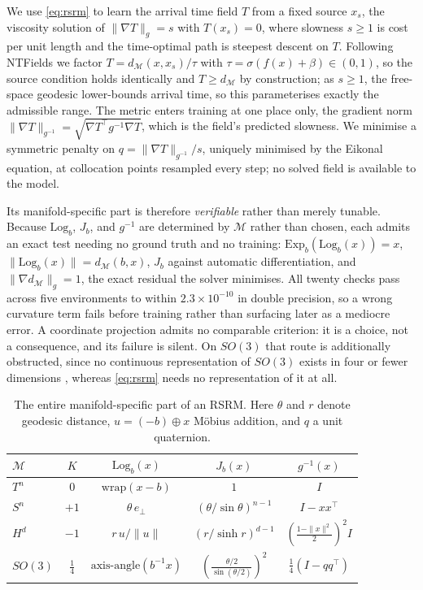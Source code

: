 We use \eqref{eq:rsrm} to learn the arrival time field $T$ from a fixed source $x_s$, the viscosity solution of $\|\nabla T\|_g = s$ with $T(x_s)=0$, where slowness $s \geq 1$ is cost per unit length and the time-optimal path is steepest descent on $T$. Following NTFields \cite{ni2023ntfields} we factor $T = d_\mathcal{M}(x,x_s)/\tau$ with $\tau = \sigma(f(x)+\beta) \in (0,1)$, so the source condition holds identically and $T \geq d_\mathcal{M}$ by construction; as $s \geq 1$, the free-space geodesic lower-bounds arrival time, so this parameterises exactly the admissible range. The metric enters training at one place only, the gradient norm $\|\nabla T\|_{g^{-1}} = \sqrt{\nabla T^\top g^{-1} \nabla T}$, which is the field's predicted slowness. We minimise a symmetric penalty on $q = \|\nabla T\|_{g^{-1}}/s$, uniquely minimised by the Eikonal equation, at collocation points resampled every step; no solved field is available to the model.

Its manifold-specific part is therefore \emph{verifiable} rather than merely tunable. Because $\mathrm{Log}_b$, $J_b$, and $g^{-1}$ are determined by $\mathcal{M}$ rather than chosen, each admits an exact test needing no ground truth and no training: $\mathrm{Exp}_b(\mathrm{Log}_b(x)) = x$, $\|\mathrm{Log}_b(x)\| = d_\mathcal{M}(b,x)$, $J_b$ against automatic differentiation, and $\|\nabla d_\mathcal{M}\|_g = 1$, the exact residual the solver minimises. All twenty checks pass across five environments to within $2.3\times10^{-10}$ in double precision, so a wrong curvature term fails before training rather than surfacing later as a mediocre error. A coordinate projection admits no comparable criterion: it is a choice, not a consequence, and its failure is silent. On $SO(3)$ that route is additionally obstructed, since no continuous representation of $SO(3)$ exists in four or fewer dimensions \cite{zhou2019continuity}, whereas \eqref{eq:rsrm} needs no representation of it at all.

\begin{table}[t]
\centering
\caption{The entire manifold-specific part of an \ac{RSRM}. Here $\theta$ and $r$ denote geodesic distance, $u = (-b) \oplus x$ M\"obius addition, and $q$ a unit quaternion.}
\label{tab:geometry}
\footnotesize
\begin{tabular}{lcccc}
\hline
$\mathcal{M}$ & $K$ & $\mathrm{Log}_b(x)$ & $J_b(x)$ & $g^{-1}(x)$ \\
\hline
$T^n$    & $0$            & $\mathrm{wrap}(x-b)$                  & $1$                                                 & $I$ \\
$S^n$    & $+1$           & $\theta \, e_\perp$                   & $(\theta/\sin\theta)^{n-1}$                         & $I - xx^\top$ \\
$H^d$    & $-1$           & $r \, u/\|u\|$                        & $(r/\sinh r)^{d-1}$                                 & $\left(\tfrac{1-\|x\|^2}{2}\right)^{2} I$ \\
$SO(3)$  & $\tfrac{1}{4}$ & $\mathrm{axis\text{-}angle}(b^{-1}x)$ & $\left(\tfrac{\theta/2}{\sin(\theta/2)}\right)^{2}$ & $\tfrac{1}{4}(I - qq^\top)$ \\
\hline
\end{tabular}
\end{table}

